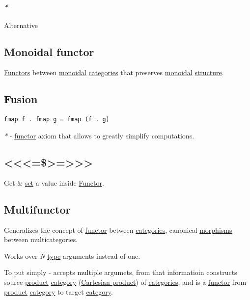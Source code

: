 \documentclass[a4paper,14pt,oneside]{book}
\begin{document}
\paragraph{\emph{*}}
\label{sec:orgee5193c}

\label{org1570d64}Alternative

\subsection{\label{org7364a04}Monoidal functor}
\label{sec:orge0ecd83}
\hyperref[orgb8acecf]{Functors} between \hyperref[org6910901]{monoidal} \hyperref[org4d3db22]{categories} that preserves \hyperref[org6910901]{monoidal} \hyperref[org2f3ef45]{structure}.

\subsection{\label{org587fb9f}Fusion}
\label{sec:org6e8e979}
\begin{verbatim}
fmap f . fmap g = fmap (f . g)
\end{verbatim}

\emph{*} - \hyperref[org61d5270]{functor} axiom that allows to greatly simplify computations.

\subsection{<<<=\$>=>>>}
\label{sec:org8702f05}
Get \& \hyperref[org128a409]{set} a value inside \hyperref[org61d5270]{Functor}.

\subsection{\label{org16b883a}Multifunctor}
\label{sec:org9f6a720}
Generalizes the concept of \hyperref[org61d5270]{functor} between \hyperref[org4d3db22]{categories}, canonical \hyperref[org46b4110]{morphisms} between multicategories.

Works over \emph{N} \hyperref[org1eff537]{type} arguments instead of one.

To put simply - accepts multiple argumets, from that informatioin constructs source \hyperref[org90a2f94]{product} \hyperref[orge2e250a]{category} (\hyperref[orgaccf8ee]{Cartesian product}) of \hyperref[org4d3db22]{categories}, and is a \hyperref[org61d5270]{functor} from \hyperref[org90a2f94]{product} \hyperref[orge2e250a]{category} to target \hyperref[orge2e250a]{category}.
\end{document}
